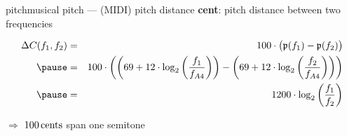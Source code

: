         \begin{frame}{pitch}{musical pitch --- (MIDI) pitch distance}
                \textbf{cent}: pitch distance between two frequencies
                \begin{footnotesize}
                \begin{eqnarray*}\label{eq:cent}
                    \Delta C(f_1,f_2)	&=& 100\cdot\big(\mathfrak{p}(f_1) - \mathfrak{p}(f_2)\big)\\
                                        \pause
                                        &=& 100\cdot\left(\left(69 + 12\cdot\log_2\left(\frac{f_1}{f_{A4}}\right)\right) - \left(69 + 12\cdot\log_2\left(\frac{f_2}{f_{A4}}\right)\right)\right)\\
                                        \pause
                                        &=& 1200\cdot\log_2\left( \frac{f_1}{f_2} \right) 
                \end{eqnarray*}
                \end{footnotesize}
                $\Rightarrow$ $\unit[100]{cents}$ span one semitone
        \end{frame}
        
